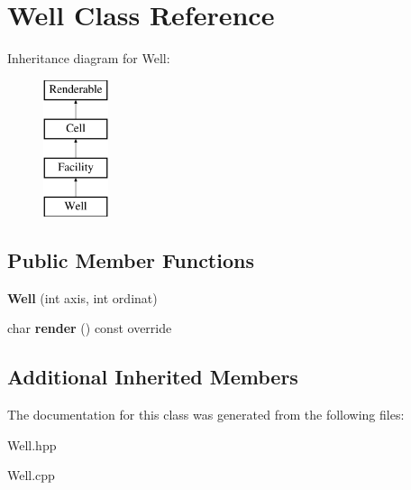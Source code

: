 \hypertarget{class_well}{}\section{Well Class Reference}
\label{class_well}
Inheritance diagram for Well\+:\begin{figure}[H]
\begin{center}
\leavevmode
\includegraphics[height=4.000000cm]{class_well}
\end{center}
\end{figure}
\subsection*{Public Member Functions}
\begin{DoxyCompactItemize}
\item 
\mbox{\label{class_well_aa7e8361ac2561745647cf887bdd08eab}} 
{\bfseries Well} (int axis, int ordinat)
\item 
\mbox{\label{class_well_a6a01858d1851a60b7ebac20b2c8a295f}} 
char {\bfseries render} () const override
\end{DoxyCompactItemize}
\subsection*{Additional Inherited Members}


The documentation for this class was generated from the following files\+:\begin{DoxyCompactItemize}
\item 
Well.\+hpp\item 
Well.\+cpp\end{DoxyCompactItemize}
